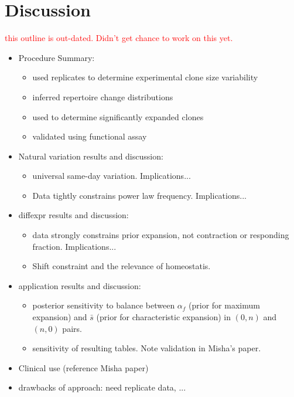 \documentclass[letterpaper,english,prl,reprint,longbibliography]{revtex4-1} %
\newcommand{\re}[1]{\textcolor{red}{#1}}
\begin{document}
\section*{Discussion}
\re{this outline is out-dated. Didn't get chance to work on this yet.}
\begin{itemize}
	\item  Procedure Summary:
		\begin{itemize}
			\item  used replicates to determine experimental clone size variability
			\item  inferred repertoire change distributions 
			\item  used to determine significantly expanded clones
			\item  validated using functional assay
		\end{itemize}
	\item  Natural variation results and discussion:
		\begin{itemize}
			\item  universal same-day variation. Implications...
			\item  Data tightly constrains power law frequency. Implications...
		\end{itemize}
	\item  diffexpr results and discussion:
		\begin{itemize}
			\item  data strongly constrains prior expansion, not contraction or responding fraction. Implications...
			\item  Shift constraint and the relevance of homeostatis.

		\end{itemize}
    \item  application results and discussion:
		\begin{itemize}
			\item  posterior sensitivity to balance between $\alpha_f$ (prior for maximum expansion) and $\bar{s}$ (prior for characteristic expansion) in $(0,n)$ and $(n,0)$ pairs.
			\item  sensitivity of resulting tables. Note validation in Misha's paper.
		\end{itemize}
	\item  Clinical use (reference Misha paper)
	\item  drawbacks of approach: need replicate data, ...
\end{itemize}
\end{document}
